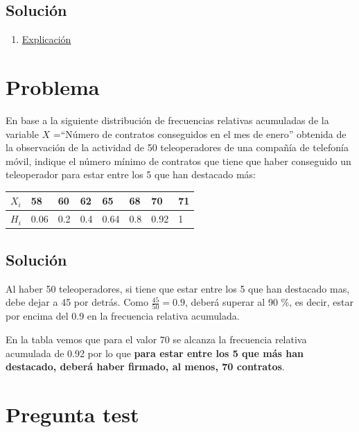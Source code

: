 \documentclass[
]{book}
\providecommand{\tightlist}{%
  \setlength{\itemsep}{0pt}\setlength{\parskip}{0pt}}
\begin{document}
\hypertarget{soluciuxf3n-1}{%
\subsection{Solución}\label{soluciuxf3n-1}}

\begin{enumerate}
\def\labelenumi{\alph{enumi})}
\setcounter{enumi}{1}
\tightlist
\item
  \href{https://1fjmanzano.github.io/bioestadistica/tipos-de-variables.html}{Explicación}
\end{enumerate}

\hypertarget{problema}{%
\section{Problema}\label{problema}}

En base a la siguiente distribución de frecuencias relativas acumuladas de la variable \(X\) =``Número de contratos conseguidos en el mes de enero'' obtenida de la observación de la actividad de 50 teleoperadores de
una compañía de telefonía móvil, indique el número mínimo de contratos que tiene que haber conseguido un teleoperador para estar entre los 5 que han destacado más:

\begin{longtable}[]{@{}llllllll@{}}
\toprule
\(X_i\) & 58 & 60 & 62 & 65 & 68 & 70 & 71\tabularnewline
\midrule
\endhead
\(H_i\) & 0.06 & 0.2 & 0.4 & 0.64 & 0.8 & 0.92 & 1\tabularnewline
\bottomrule
\end{longtable}

\hypertarget{soluciuxf3n-2}{%
\subsection{Solución}\label{soluciuxf3n-2}}

Al haber 50 teleoperadores, si tiene que estar entre los 5 que han destacado mas, debe dejar a 45 por detrás. Como \(\frac{45}{50}=0.9\), deberá superar al 90 \%, es decir, estar por encima del 0.9 en la frecuencia relativa acumulada.

En la tabla vemos que para el valor 70 se alcanza la frecuencia relativa acumulada de 0.92 por lo que \textbf{para estar entre los 5 que más han destacado, deberá haber firmado, al menos, 70 contratos}.

\hypertarget{pregunta-test-2}{%
\section{Pregunta test}\label{pregunta-test-2}}
\end{document}
